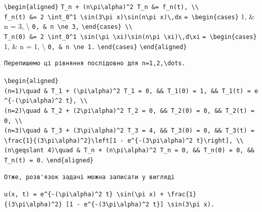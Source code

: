 \documentclass[
  ukrainian,
]{article}
\begin{document}
\texttt{\textbackslash{}begin\{aligned\}}
\texttt{T\_n\textquotesingle{}\ +\ (n\textbackslash{}pi\textbackslash{}alpha)\^{}2\ T\_n\ \&=\ f\_n(t),\ \textbackslash{}\textbackslash{}}
\texttt{f\_n(t)\ \&=\ 2\ \textbackslash{}int\_0\^{}1\ \textbackslash{}sin(3\textbackslash{}pi\ x)\textbackslash{}sin(n\textbackslash{}pi\ x)\textbackslash{},dx}
\texttt{=\ \textbackslash{}begin\{cases\}} 1, \& n = 3, \textbackslash{}
\texttt{0,\ \&\ n\ \textbackslash{}ne\ 3,}
\texttt{\textbackslash{}end\{cases\}\ \textbackslash{}\textbackslash{}}
\texttt{T\_n(0)\ \&=\ 2\ \textbackslash{}int\_0\^{}1\ \textbackslash{}sin(\textbackslash{}pi\ \textbackslash{}xi)\textbackslash{}sin(n\textbackslash{}pi\ \textbackslash{}xi)\textbackslash{},d\textbackslash{}xi}
\texttt{=\ \textbackslash{}begin\{cases\}} 1, \& n = 1, \textbackslash{}
\texttt{0,\ \&\ n\ \textbackslash{}ne\ 1.}
\texttt{\textbackslash{}end\{cases\}}
\texttt{\textbackslash{}end\{aligned\}}

\begin{verbatim}
Перепишемо ці рівняння послідовно для n=1,2,\dots.
\end{verbatim}

\texttt{\textbackslash{}begin\{aligned\}}
\texttt{(n=1)\textbackslash{}quad\ \&\ T\_1\textquotesingle{}\ +\ (\textbackslash{}pi\textbackslash{}alpha)\^{}2\ T\_1\ =\ 0,\ \&\&\ T\_1(0)\ =\ 1,\ \&\&\ T\_1(t)\ =\ e\^{}\{-(\textbackslash{}pi\textbackslash{}alpha)\^{}2\ t\},\ \textbackslash{}\textbackslash{}}
\texttt{(n=2)\textbackslash{}quad\ \&\ T\_2\textquotesingle{}\ +\ (2\textbackslash{}pi\textbackslash{}alpha)\^{}2\ T\_2\ =\ 0,\ \&\&\ T\_2(0)\ =\ 0,\ \&\&\ T\_2(t)\ =\ 0,\ \textbackslash{}\textbackslash{}}
\texttt{(n=3)\textbackslash{}quad\ \&\ T\_3\textquotesingle{}\ +\ (3\textbackslash{}pi\textbackslash{}alpha)\^{}2\ T\_3\ =\ 4,\ \&\&\ T\_3(0)\ =\ 0,\ \&\&\ T\_3(t)\ =\ \textbackslash{}frac\{1\}\{(3\textbackslash{}pi\textbackslash{}alpha)\^{}2\}\textbackslash{}left{[}1\ -\ e\^{}\{-(3\textbackslash{}pi\textbackslash{}alpha)\^{}2\ t\}\textbackslash{}right{]},\ \textbackslash{}\textbackslash{}}
\texttt{(n\textbackslash{}geqslant\ 4)\textbackslash{}quad\ \&\ T\_n\textquotesingle{}\ +\ (n\textbackslash{}pi\textbackslash{}alpha)\^{}2\ T\_n\ =\ 0,\ \&\&\ T\_n(0)\ =\ 0,\ \&\&\ T\_n(t)\ =\ 0.}
\texttt{\textbackslash{}end\{aligned\}}

\begin{verbatim}
Отже, розв'язок задачі можна записати у вигляді
\end{verbatim}

\texttt{u(x,\ t)\ =\ e\^{}\{-(\textbackslash{}pi\textbackslash{}alpha)\^{}2\ t\}\ \textbackslash{}sin(\textbackslash{}pi\ x)\ +\ \textbackslash{}frac\{1\}\{(3\textbackslash{}pi\textbackslash{}alpha)\^{}2\}\ {[}1\ -\ e\^{}\{-(3\textbackslash{}pi\textbackslash{}alpha)\^{}2\ t\}{]}\ \textbackslash{}sin(3\textbackslash{}pi\ x).}
\end{document}
